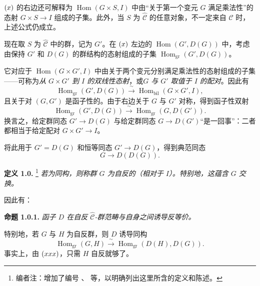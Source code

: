 \(\SGARefLink{sga3:viii:eq:1:x}{(x)}\) 的右边还可解释为 \(\operatorname{Hom}(G\times S,I)\) 中由“关于第一个变元 \(G\) 满足乘法性”的态射 \(G\times S\to I\) 组成的子集。此外，当 \(S\) 为 \(\widehat{\mathscr C}\) 的任意对象，不一定来自 \(\mathscr C\) 时，上述公式仍成立。

现在取 \(S\) 为 \(\widehat{\mathscr C}\) 中的群，记为 \(G'\)。在 \(\SGARefLink{sga3:viii:eq:1:x}{(x)}\) 左边的 \(\operatorname{Hom}(G',D(G))\) 中，考虑由保持 \(G'\) 和 \(D(G)\) 的群结构的态射组成的子集 \(\operatorname{Hom}_{\mathrm{gr}}(G',D(G))\)。

它对应于 \(\operatorname{Hom}(G\times G',I)\) 中由关于两个变元分别满足乘法性的态射组成的子集——可称为\emph{从 \(G\times G'\) 到 \(I\) 的双线性态射}，或\emph{\(G\) 与 \(G'\) 取值于 \(I\) 的配对}。因此有
\begin{equation}
  \tag{xx}
  \operatorname{Hom}_{\mathrm{gr}}(G',D(G))
  \xrightarrow{\ \sim\ }
  \operatorname{Hom}_{\mathrm{bil}}(G\times G',I),
\end{equation}
且关于对 \((G,G')\) 是函子性的。由于右边关于 \(G\) 与 \(G'\) 对称，得到函子性双射
\begin{equation}
  \tag{xxx}
  \operatorname{Hom}_{\mathrm{gr}}(G',D(G))
  \xrightarrow{\ \sim\ }
  \operatorname{Hom}_{\mathrm{gr}}(G,D(G')).
\end{equation}
换言之，给定群同态 \(G'\to D(G)\) 与给定群同态 \(G\to D(G')\)“是一回事”：二者都相当于给定配对 \(G\times G'\to I\)。

将此用于 \(G'=D(G)\) 和恒等同态 \(G'\to D(G)\)，得到典范同态
\begin{equation}
  \tag{xxxx}
  G\longrightarrow D(D(G)).
\end{equation}

\medskip
\noindent{}\textbf{定义 1.0.}
\footnote{编者注：增加了编号 、 等，以明确列出这里所含的定义和陈述。}
\textit{若为同构，则称群 \(G\) 为\emph{自反的}（相对于 \(I\)）。特别地，这蕴含 \(G\) 交换。}

因此有：

\medskip
\noindent{}\textbf{命题 1.0.1.}
\textit{函子 \(D\) 在自反 \(\widehat{\mathscr C}\)-群范畴与自身之间诱导反等价。}

特别地，若 \(G\) 与 \(H\) 为自反群，则 \(D\) 诱导同构
\[
  \operatorname{Hom}_{\mathrm{gr}}(G,H)
  \xrightarrow{\ \sim\ }
  \operatorname{Hom}_{\mathrm{gr}}(D(H),D(G)).
\]
事实上，由 \(\SGARefLink{sga3:viii:eq:1:xxx}{(xxx)}\)，只需 \(H\) 自反就够了。

